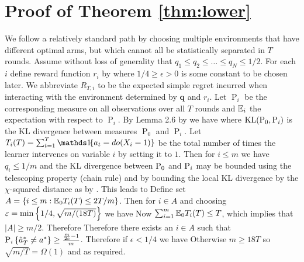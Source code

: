 \section{Proof of Theorem \ref{thm:lower}}\label{sec:thm:lower}

We follow a relatively standard path by choosing multiple environments that have different optimal arms, but which cannot all be statistically
separated in $T$ rounds.
Assume without loss of generality that $q_1 \leq q_2 \leq \ldots \leq q_N \leq 1/2$.
For each $i$ define reward function $r_i$ by
where $1/4 \geq \epsilon > 0$ is some constant to be chosen later.
We abbreviate $R_{T,i}$ to be the expected simple regret incurred when interacting with the
environment determined by $\boldsymbol{q}$ and $r_i$. Let $\operatorname{P}_i$ be the corresponding measure
on all observations over all $T$ rounds and $\mathbb E_i$ the expectation with respect to $\operatorname{P}_i$. By Lemma 2.6 by \citet{Tsy08} we have
where $\operatorname{KL}(\operatorname{P}_0, \operatorname{P}_i)$ is the KL divergence between measures $\operatorname{P}_0$ and $\operatorname{P}_i$.
Let $T_i(T) = \sum_{t=1}^T \ind{a_t = do(X_i = 1)}$ be the total number of times the learner intervenes on variable $i$ by setting it to $1$.
Then for $i \leq m$ we have $q_i \leq 1/m$ and the KL divergence between $\operatorname{P}_0$ and $\operatorname{P}_i$ may be bounded using the telescoping property (chain rule) and
by bounding the local KL divergence by the $\chi$-squared distance as by \citet{Auer1995}. This leads to 
Define set $A = \left\{i \leq m : \mathbb E_0 T_i(T) \leq 2T / m\right\}$.
Then for $i \in A$ and choosing $\varepsilon = \min\left\{1/4, \sqrt{m/(18T)}\right\}$ we have
Now $\sum_{i=1}^m \mathbb E_0 T_i(T) \leq T$, which implies that $|A| \geq m/2$.
Therefore
Therefore there exists an $i \in A$ such that
$\operatorname{P}_i\left\{\hat a^*_T \neq a^*\right\} \geq \frac{\frac{m}{2e} - 1}{m}$. 
Therefore if $\epsilon < 1/4$ we have
Otherwise $m \geq 18T$ so $\sqrt{m/T} = \Omega(1)$ and
as required.

